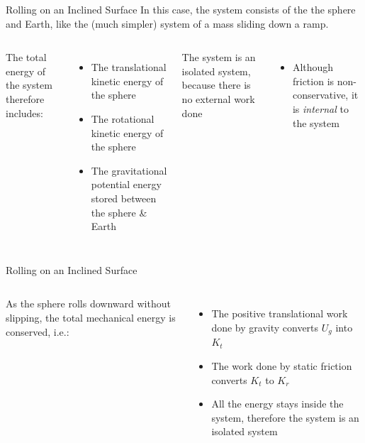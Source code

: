 \documentclass[12pt,compress,aspectratio=169]{beamer}
\begin{document}
\begin{frame}{Rolling on an Inclined Surface}
  In this case, the system consists of the the sphere and Earth, like the
  (much simpler) system of a mass sliding down a ramp.

  \vspace{.2in}
  \begin{columns}
    

    The total energy of the system therefore includes:
    \begin{itemize}
    \item The translational kinetic energy of the sphere
    \item The rotational kinetic energy of the sphere
    \item The gravitational potential energy stored between the sphere \& Earth
    \end{itemize}
    The system is an isolated system, because there is no external work done
    \begin{itemize}
    \item Although friction is non-conservative, it is \emph{internal} to the
      system
    \end{itemize}
  \end{columns}
\end{frame}



\begin{frame}{Rolling on an Inclined Surface}
  \begin{columns}
    

    As the sphere rolls downward without slipping, the total mechanical
    energy is conserved, i.e.:

    \begin{itemize}
    \item\vspace{-.1in}The positive translational work done by gravity converts
      $U_g$ into $K_t$
    \item The work done by static friction converts $K_t$ to $K_r$
    \item All the energy stays inside the system, therefore the system is an
      isolated system
    \end{itemize}
  \end{columns}
\end{frame} 
\end{document}
